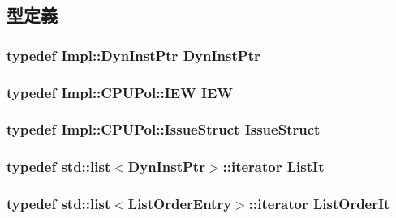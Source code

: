 \subsection{型定義}
\hypertarget{classInstructionQueue_a028ce10889c5f6450239d9e9a7347976}{
\subsubsection[{DynInstPtr}]{\setlength{\rightskip}{0pt plus 5cm}typedef Impl::DynInstPtr {\bf DynInstPtr}}}
\label{classInstructionQueue_a028ce10889c5f6450239d9e9a7347976}
\hypertarget{classInstructionQueue_a23f60a4095b5240dfcb18a4ec40210a9}{
\subsubsection[{IEW}]{\setlength{\rightskip}{0pt plus 5cm}typedef Impl::CPUPol::IEW {\bf IEW}}}
\label{classInstructionQueue_a23f60a4095b5240dfcb18a4ec40210a9}
\hypertarget{classInstructionQueue_aa56c7524890b3a6337668c507be0f272}{
\subsubsection[{IssueStruct}]{\setlength{\rightskip}{0pt plus 5cm}typedef Impl::CPUPol::IssueStruct {\bf IssueStruct}}}
\label{classInstructionQueue_aa56c7524890b3a6337668c507be0f272}
\hypertarget{classInstructionQueue_a184cb829e22cc656acb41864f68f51ea}{
\subsubsection[{ListIt}]{\setlength{\rightskip}{0pt plus 5cm}typedef {\bf std::list}$<${\bf DynInstPtr}$>$::iterator {\bf ListIt}}}
\label{classInstructionQueue_a184cb829e22cc656acb41864f68f51ea}
\hypertarget{classInstructionQueue_a120a1fba4fe015f7201e896580df164c}{
\subsubsection[{ListOrderIt}]{\setlength{\rightskip}{0pt plus 5cm}typedef {\bf std::list}$<${\bf ListOrderEntry}$>$::iterator {\bf ListOrderIt}}}

